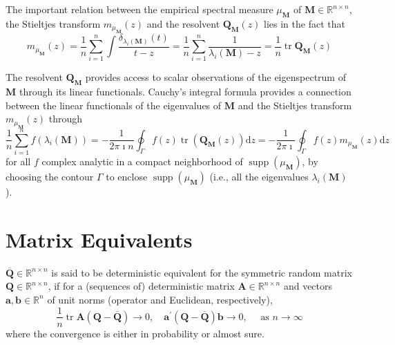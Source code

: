 \begin{remark}
	The important relation between the empirical spectral measure $\mu_{\mathbf{M}}$ of $\mathbf{M}\in\mathbb{R}^{n\times n}$, the Stieltjes transform $m_{\mu_{\mathbf{M}}}(z)$ and the resolvent $\mathbf{Q}_{\mathbf{M}}(z)$ lies in the fact that
	\begin{equation} \label{eq:relation-between-empirical-spectral-measures-stieltjes-transform-and-its-resolvent}
		m_{\mu_{\mathbf{M}}}(z)=\frac{1}{n}\sum_{i=1}^{n}\int\frac{\delta_{\lambda_{i}(\mathbf{M})}(t)}{t-z}=\frac{1}{n}\sum_{i=1}^{n}\frac{1}{\lambda_{i}(\mathbf{M})-z}=\frac{1}{n}\operatorname{tr}\mathbf{Q}_{\mathbf{M}}(z)
	\end{equation}
\end{remark}

The resolvent $\mathbf{Q}_{\mathbf{M}}$ provides access to scalar observations of the eigenspectrum of $\mathbf{M}$ through its linear functionals. Cauchy’s integral formula provides a connection between the linear functionals of the eigenvalues of $\mathbf{M}$ and the Stieltjes transform $m_{\mu_{\mathbf{M}}}(z)$ through
\begin{equation}
	\frac{1}{n}\sum_{i=1}^{n}f\left(\lambda_{i}(\mathbf{M})\right)=-\frac{1}{2\pi\imath n}\oint_{\Gamma}f(z)\operatorname{tr}\left(\mathbf{Q}_{\mathbf{M}}(z)\right)\mathrm{d}z=-\frac{1}{2\pi\imath }\oint_{\Gamma}f(z)m_{\mu_{\mathbf{M}}}(z)\mathrm{d}z
\end{equation}
for all $f$ complex analytic in a compact neighborhood of $\operatorname{supp}\left(\mu_{\mathbf{M}}\right)$, by choosing the contour $\Gamma$ to enclose $\operatorname{supp}\left(\mu_{\mathbf{M}}\right)$ (i.e., all the eigenvalues $\lambda_{i}(\mathbf{M})$).

\section{Matrix Equivalents}

\begin{definition}
	$\overline{\mathbf{Q}}\in\mathbb{R}^{n\times n}$ is said to be deterministic equivalent for the symmetric random matrix $\mathbf{Q}\in\mathbb{R}^{n\times n}$, if for a (sequences of) deterministic matrix $\mathbf{A}\in\mathbb{R}^{n\times n}$ and vectors $\mathbf{a},\mathbf{b}\in\mathbb{R}^{n}$ of unit norms (operator and Euclidean, respectively),
	\begin{equation}
		\frac{1}{n}\operatorname{tr}\mathbf{A}(\mathbf{Q}-\overline{\mathbf{Q}})\rightarrow 0,\quad\mathbf{a}^{\prime}(\mathbf{Q}-\overline{\mathbf{Q}})\mathbf{b}\rightarrow 0,\quad\text{ as }n\rightarrow\infty
	\end{equation}
	where the convergence is either in probability or almost sure.
\end{definition}

